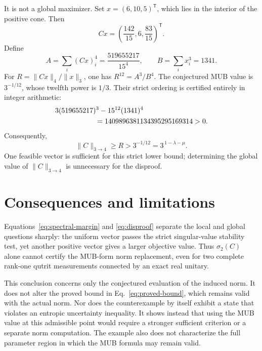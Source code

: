 \documentclass[aps,pra,reprint,superscriptaddress,nofootinbib,longbibliography]{revtex4-2}
\begin{document}
It is not a global maximizer.  Set
$x=(6,10,5)^{\mathsf T}$, which lies in the interior of the positive cone.
Then
\begin{equation}
 Cx=\left(\frac{142}{15},6,\frac{83}{15}\right)^{\mathsf T}.
 \label{eq:witness-image}
\end{equation}
Define
\begin{equation}
 A=\sum_i(Cx)_i^4=\frac{519655217}{15^4},
 \qquad B=\sum_i x_i^3=1341.
 \label{eq:AB}
\end{equation}
For $R=\|Cx\|_4/\|x\|_3$, one has $R^{12}=A^3/B^4$.
The conjectured MUB value is $3^{-1/12}$, whose twelfth power is $1/3$.
Their strict ordering is certified entirely in integer arithmetic:
\begin{align}
 &3(519655217)^3-15^{12}(1341)^4\notag\\
 &\hspace{2.0cm}=1409896381134395295169314>0.
 \label{eq:integer-certificate}
\end{align}
Consequently,
\begin{equation}
 \|C\|_{3\to4}\geq R>3^{-1/12}
 =3^{\,1-\lambda-\mu}.
 \label{eq:disproof}
\end{equation}
One feasible vector is sufficient for this strict lower bound; determining
the global value of $\|C\|_{3\to4}$ is unnecessary for the disproof.

\section{Consequences and limitations}

Equations~\eqref{eq:spectral-margin} and \eqref{eq:disproof} separate the
local and global questions sharply: the uniform vector passes the strict
singular-value stability test, yet another positive vector gives a larger
objective value.  Thus $\sigma_2(C)$ alone cannot certify the MUB-form norm
replacement, even for two complete rank-one qutrit measurements connected by
an exact real unitary.

This conclusion concerns only the conjectured evaluation of the induced
norm.  It does not alter the proved bound in Eq.~\eqref{eq:proved-bound}, which
remains valid with the actual norm.  Nor does the counterexample by itself
exhibit a state that violates an entropic uncertainty inequality.  It shows
instead that using the MUB value at this admissible point would require a
stronger sufficient criterion or a separate norm computation.  The example
also does not characterize the full parameter region in which the MUB formula
may remain valid.
\end{document}
